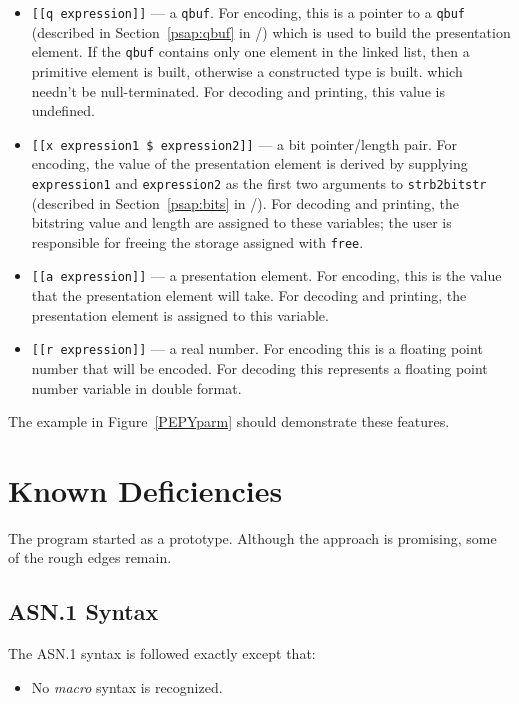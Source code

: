 \begin{itemize}
\item	\verb"[[q expression]]" --- a \verb"qbuf".
For encoding,
this is a pointer to a \verb"qbuf"
(described in Section~\ref{psap:qbuf} in \volone/) which is used to build the
presentation element.
If the \verb"qbuf" contains only one element in the linked list,
then a primitive element is built,
otherwise a constructed type is built.
which needn't be null-terminated.
For decoding and printing,
this value is undefined.

\item	\verb"[[x expression1 $ expression2]]" --- a bit pointer/length pair.
For encoding,
the value of the presentation element is derived by supplying
\verb"expression1" and \verb"expression2" 
as the first two arguments to \verb"strb2bitstr"
(described in Section~\ref{psap:bits} in \volone/).
For decoding and printing,
the bitstring value and length are assigned to these variables;
the user is responsible for freeing the storage assigned with \verb"free".

\item	\verb"[[a expression]]" --- a presentation element.
For encoding,
this is the value that the presentation element will take.
For decoding and printing,
the presentation element is assigned to this variable.

\item	\verb"[[r expression]]" --- a real number. For encoding this
is a floating point number that will be encoded. For decoding this
represents a floating point number variable in double format.
\end{itemize}

The example in Figure~\ref{PEPYparm} should demonstrate these features.
\clearpage
{}
\clearpage
{}\empty

\section	{Known Deficiencies}
The  program started as a prototype.
Although the approach is promising, some of the rough edges remain.

\subsection	{ASN.1 Syntax}\label{pepy:syntax}
The ASN.1 syntax is followed exactly except that:
\begin{itemize}
\item	No {\em macro\/} syntax is recognized.
\end{itemize}

